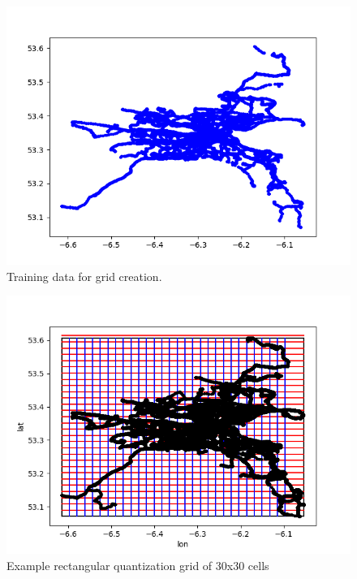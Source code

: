 \documentclass[12pt]{article}
\begin{document}
	\begin{figure} [H]
		\begin{center}
			\includegraphics [scale = 0.70] {data_minmax_grid_extent.png}
			\caption{Training data for grid creation.}
		\end{center}
	\end{figure} 
	\begin{figure} [H]
		\begin{center}
			\includegraphics [scale = 0.70] {grid.png}
			\caption{Example rectangular quantization grid of 30x30 cells}
		\end{center}
	\end{figure} 
\end{document}

